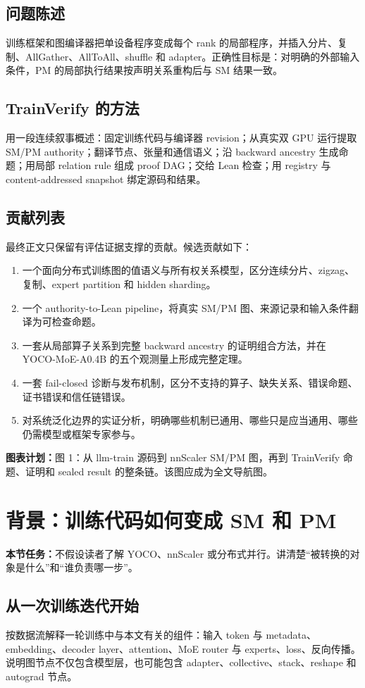 \documentclass[11pt,a4paper]{ctexart}
\newcommand{\contract}[1]{\par\smallskip\noindent\colorbox{light}{\parbox{0.95\linewidth}{\textbf{本节任务：}#1}}\par\smallskip}
\newcommand{\figplan}[1]{\par\noindent\textbf{图表计划：}#1\par}
\begin{document}
\subsection{问题陈述}
训练框架和图编译器把单设备程序变成每个 rank 的局部程序，并插入分片、复制、AllGather、AllToAll、shuffle 和 adapter。正确性目标是：对明确的外部输入条件，PM 的局部执行结果按声明关系重构后与 SM 结果一致。

\subsection{TrainVerify 的方法}
用一段连续叙事概述：固定训练代码与编译器 revision；从真实双 GPU 运行提取 SM/PM authority；翻译节点、张量和通信语义；沿 backward ancestry 生成命题；用局部 relation rule 组成 proof DAG；交给 Lean 检查；用 registry 与 content-addressed snapshot 绑定源码和结果。

\subsection{贡献列表}
最终正文只保留有评估证据支撑的贡献。候选贡献如下：
\begin{enumerate}
  \item 一个面向分布式训练图的值语义与所有权关系模型，区分连续分片、zigzag、复制、expert partition 和 hidden sharding。
  \item 一个 authority-to-Lean pipeline，将真实 SM/PM 图、来源记录和输入条件翻译为可检查命题。
  \item 一套从局部算子关系到完整 backward ancestry 的证明组合方法，并在 YOCO-MoE-A0.4B 的五个观测量上形成完整定理。
  \item 一套 fail-closed 诊断与发布机制，区分不支持的算子、缺失关系、错误命题、证书错误和信任链错误。
  \item 对系统泛化边界的实证分析，明确哪些机制已通用、哪些只是应当通用、哪些仍需模型或框架专家参与。
\end{enumerate}

\figplan{图 1：从 llm-train 源码到 nnScaler SM/PM 图，再到 TrainVerify 命题、证明和 sealed result 的整条链。该图应成为全文导航图。}

\section{背景：训练代码如何变成 SM 和 PM}
\contract{不假设读者了解 YOCO、nnScaler 或分布式并行。讲清楚“被转换的对象是什么”和“谁负责哪一步”。}

\subsection{从一次训练迭代开始}
按数据流解释一轮训练中与本文有关的组件：输入 token 与 metadata、embedding、decoder layer、attention、MoE router 与 experts、loss、反向传播。说明图节点不仅包含模型层，也可能包含 adapter、collective、stack、reshape 和 autograd 节点。
\end{document}
